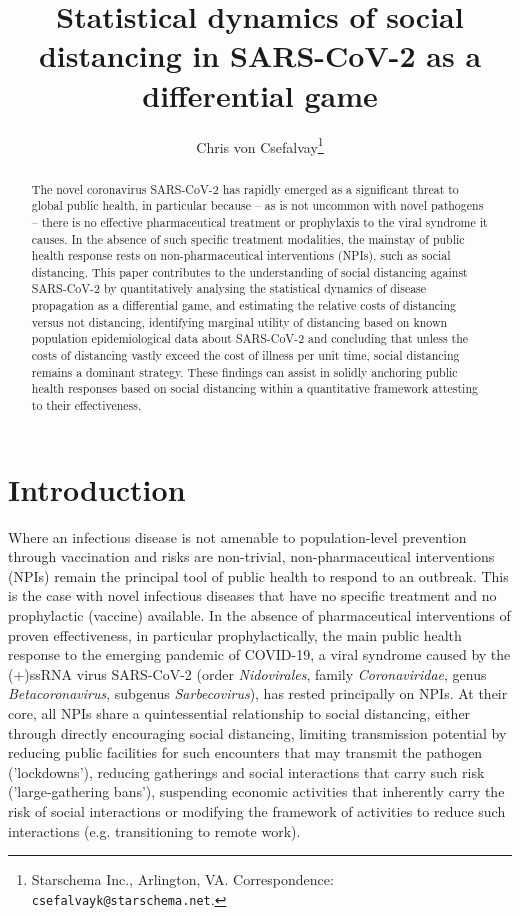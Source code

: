 \documentclass[12pt]{article}
\title{Statistical dynamics of social distancing in SARS-CoV-2 as a differential game}
\author{Chris von Csefalvay\thanks{Starschema Inc., Arlington, VA. Correspondence: \texttt{csefalvayk@starschema.net}.}}
\begin{document}
\maketitle

\begin{abstract}
    The novel coronavirus SARS-CoV-2 has rapidly emerged as a significant threat to global public health, in particular because -- as is not uncommon with novel pathogens -- there is no effective pharmaceutical treatment or prophylaxis to the viral syndrome it causes. In the absence of such specific treatment modalities, the mainstay of public health response rests on non-pharmaceutical interventions (NPIs), such as social distancing. This paper contributes to the understanding of social distancing against SARS-CoV-2 by quantitatively analysing the statistical dynamics of disease propagation as a differential game, and estimating the relative costs of distancing versus not distancing, identifying marginal utility of distancing based on known population epidemiological data about SARS-CoV-2 and concluding that unless the costs of distancing vastly exceed the cost of illness per unit time, social distancing remains a dominant strategy. These findings can assist in solidly anchoring public health responses based on social distancing within a quantitative framework attesting to their effectiveness.
\end{abstract}

\section{Introduction} %
\label{sec:introduction}
Where an infectious disease is not amenable to population-level prevention through vaccination and risks are non-trivial, non-pharmaceutical interventions (NPIs) remain the principal tool of public health to respond to an outbreak. This is the case with novel infectious diseases that have no specific treatment and no prophylactic (vaccine) available. In the absence of pharmaceutical interventions of proven effectiveness, in particular prophylactically, the main public health response to the emerging pandemic of COVID-19, a viral syndrome caused by the (+)ssRNA virus SARS-CoV-2 (order \emph{Nidovirales}, family \emph{Coronaviridae}, genus \emph{Betacoronavirus}, subgenus \emph{Sarbecovirus}), has rested principally on NPIs.\cite{McCoy_2020,Lai_2020,flaxman2020report,ferguson2020report} At their core, all NPIs share a quintessential relationship to social distancing, either through directly encouraging social distancing, limiting transmission potential by reducing public facilities for such encounters that may transmit the pathogen ('lockdowns'), reducing gatherings and social interactions that carry such risk ('large-gathering bans'), suspending economic activities that inherently carry the risk of social interactions or modifying the framework of activities to reduce such interactions (e.g. transitioning to remote work).
\end{document}
